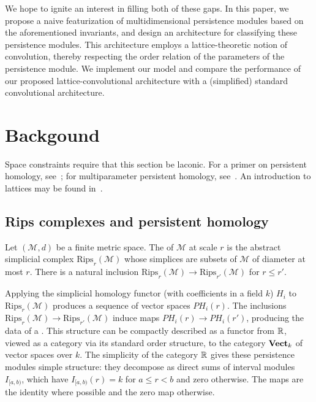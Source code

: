 \documentclass{article}
\begin{document}
We hope to ignite an interest in filling both of these gaps. In this paper, we
propose a naive featurization of multidimensional persistence modules based on
the aforementioned invariants, and design an architecture for classifying these
persistence modules. This architecture employs a lattice-theoretic notion of
convolution, thereby respecting the order relation of the parameters of the
persistence module. We implement our model and compare the performance of our
proposed lattice-convolutional architecture with a (simplified) standard
convolutional architecture.

\section{Backgound}

Space constraints require that this section be laconic. For a primer on
persistent homology, see~\cite{ghrist_barcodes:_2008, carlsson_topology_2009};
for multiparameter persistent homology, see~\cite{lesnick_interactive_2015}. An
introduction to lattices may be found in~\cite{davey2002introduction}.

\subsection{Rips complexes and persistent homology}
Let $(\mathcal M,d)$ be a finite metric space. The  of $\mathcal M$ at scale $r$ is the abstract simplicial complex
$\text{Rips}_r(\mathcal M)$ whose simplices are subsets of $\mathcal M$ of
diameter at most $r$. There is a natural inclusion $\text{Rips}_r(\mathcal M)
\to \text{Rips}_{r'}(\mathcal M)$ for $r \leq r'$.

Applying the simplicial homology functor (with coefficients in a field $k$)
$H_i$ to $\text{Rips}_r(\mathcal M)$ produces a sequence of vector spaces
$PH_i(r)$. The inclusions $\text{Rips}_r(\mathcal M) \to
\text{Rips}_{r'}(\mathcal M)$ induce maps $PH_i(r) \to PH_i(r')$, producing the
data of a . This structure can be compactly
described as a functor from $\mathbb{R}$, viewed as a category via its standard order
structure, to the category $\operatorname{\mathbf{Vect}}_k$ of vector spaces over $k$. The simplicity
of the category $\mathbb{R}$ gives these persistence modules simple structure: they
decompose as direct sums of interval modules $I_{[a,b)}$, which have
$I_{[a,b)}(r) = k$ for $a \leq r < b$ and zero otherwise. The maps are the
identity where possible and the zero map otherwise.
\end{document}
